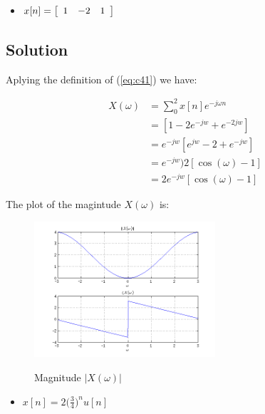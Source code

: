 \begin{itemize}
\item 
$x[n] =
\left[ \begin{array}{c c c}
1 & -2 & 1
\end{array} \right] $
\end{itemize} 

\subsection*{Solution}

Aplying the definition of (\ref{eq:c41}) we have:

\begin{equation*}
\begin{aligned}
X(\omega) &= \displaystyle\sum_{0}^{2} x[n] e^{-j \omega n} \\
&= [1 - 2e^{-jw} + e^{-2jw} ] \\
&= e^{-jw} [e^{jw} - 2 + e^{-jw} ] \\
&= e^{-jw}) 2[ \cos(\omega) - 1 ] \\
&= 2e^{-jw}[ \cos(\omega) - 1 ] 
\end{aligned}
\end{equation*} 

The plot of the magintude $X(\omega)$ is:

\begin{figure}[H]
\caption{Magnitude $|X(\omega)|$}
\centering
\includegraphics[width=0.6\textwidth]{figs/c4p1b.png}
\label{fig:c4p1b}
\end{figure} 

\begin{itemize}
\item 
$x[n] =2\big(\frac{3}{4}\big)^n u[n] $
\end{itemize} 

